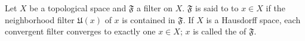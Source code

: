 Let $X$ be a topological space and $\mathfrak{F}$ a filter on $X$. $\mathfrak{F}$ is said to  to $x \in X$ if the neighborhood filter $\mathfrak{U}(x)$ of $x$ is contained in $\mathfrak{F}$. If $X$ is a Hausdorff space, each convergent filter converges to exactly one $x \in X$; $x$ is called the  of $\mathfrak{F}$.
